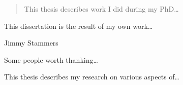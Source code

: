 
\begin{abstract}
        This thesis describes work I did during my PhD\ldots
\end{abstract}

\begin{declaration}
This dissertation is the result of my own work\ldots
        \vspace*{1cm}
        \begin{flushright}
        Jimmy Stammers
        \end{flushright}
\end{declaration}

\begin{acknowledgements}
    Some people worth thanking\ldots
\end{acknowledgements}

\begin{preface}
    This thesis describes my research on various aspects of\ldots
\end{preface}


\tableofcontents
\listoffigures
\listoftables